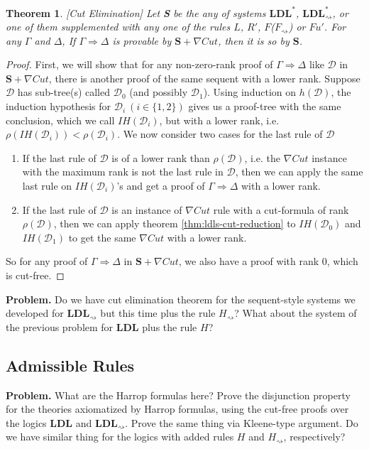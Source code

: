 \documentclass[12pt,a4paper]{article}
\theoremstyle{plain}
\newtheorem{thm}{Theorem}[section]
\theoremstyle{definition}
\begin{document}
\begin{thm}\label{thm:ldls-cut-elim}[Cut Elimination]
	Let \textbf{S} be the any of systems $\mathbf{LDL}^{*}$, $\mathbf{LDL}^{*}_{\rightsquigarrow}$, or one of them supplemented with any one of the rules $L$, $R'$, $F$($F_\rightsquigarrow$) or $Fu'$. For any $\Gamma$ and $\Delta$, If $\Gamma \Rightarrow \Delta$ is provable by $\mathbf{S} + \nabla Cut$, then it is so by $\mathbf{S}$.
\end{thm}
\begin{proof}
		First, we will show that for any non-zero-rank proof of $\Gamma \Rightarrow \Delta$ like $\mathcal{D}$ in $\mathbf{S} + \nabla Cut$, there is another proof of the same sequent with a lower rank. Suppose $\mathcal{D}$ has sub-tree(s) called $\mathcal{D}_0$ (and possibly $\mathcal{D}_1$). Using induction on $h(\mathcal{D})$, the induction hypothesis for $\mathcal{D}_i ~(i \in \{1,2\})$ gives us a proof-tree with the same conclusion, which we call $IH(\mathcal{D}_i)$, but with a lower rank, i.e. $\rho(IH(\mathcal{D}_i)) < \rho(\mathcal{D}_i)$. We now consider two cases for the last rule of $\mathcal{D}$

	\begin{enumerate}[label=\Roman*]
		\item If the last rule of $\mathcal{D}$ is of a lower rank than $\rho(\mathcal{D})$, i.e. the $\nabla Cut$ instance with the maximum rank is not the last rule in $\mathcal{D}$, then we can apply the same last rule on $IH(\mathcal{D}_i)$'s and get a proof of $\Gamma \Rightarrow \Delta$ with a lower rank.
		
		\item If the last rule of $\mathcal{D}$ is an instance of $\nabla Cut$ rule with a cut-formula of rank $\rho(\mathcal{D})$, then we can apply theorem \ref{thm:ldls-cut-reduction} to $IH(\mathcal{D}_0)$ and $IH(\mathcal{D}_1)$ to get the same $\nabla Cut$ with a lower rank.
	\end{enumerate}
	So for any proof of $\Gamma \Rightarrow \Delta$ in $\mathbf{S} + \nabla Cut$, we also have a proof with rank $0$, which is cut-free.
\end{proof}

\textbf{Problem.} Do we have cut elimination theorem for the sequent-style systems we developed for $\mathbf{LDL}_{\rightsquigarrow}$ but this time plus the rule $H_{\rightsquigarrow}$? What about the system of the previous problem for $\mathbf{LDL}$ plus the rule $H$?
\subsection{Admissible Rules}
\textbf{Problem.} What are the Harrop formulas here? Prove the disjunction property for the theories axiomatized by Harrop formulas, using the cut-free proofs over the logics $\mathbf{LDL}$ and $\mathbf{LDL}_{\rightsquigarrow}$. Prove the same thing via Kleene-type argument. Do we have similar thing for the logics with added rules $H$ and $H_{\rightsquigarrow}$, respectively?
\end{document}
